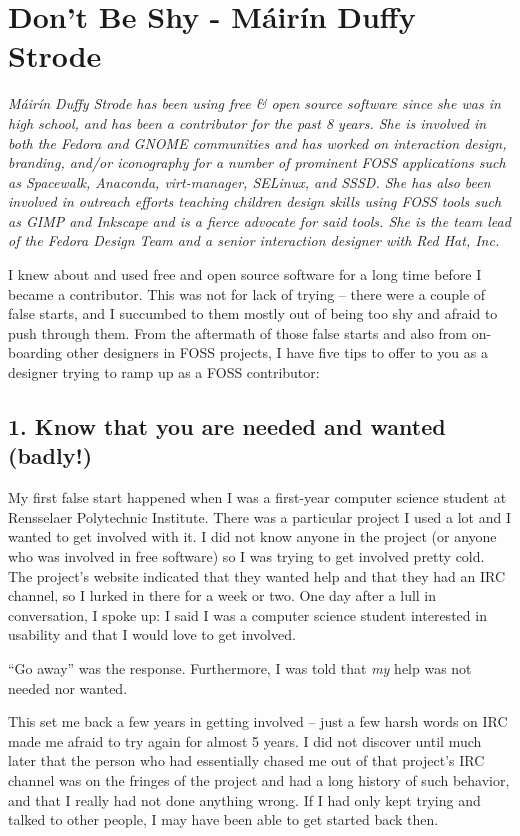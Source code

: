 \chapter{Don't Be Shy - Máirín Duffy Strode}

\textit{Máirín Duffy Strode has been using free \& open source software since she
was in high school, and has been a contributor for the past 8 years. She is involved
in both the Fedora and GNOME communities and has worked on interaction design,
branding, and/or iconography for a number of prominent FOSS applications such as
Spacewalk, Anaconda, virt-manager, SELinux, and SSSD. She has also been involved
in outreach efforts teaching children design skills using FOSS tools such as
GIMP and Inkscape and is a fierce advocate for said tools. She is the team lead
of the Fedora Design Team and a senior interaction designer with Red Hat, Inc.}

I knew about and used free and open source software for a long time before I
became a contributor. This was not for lack of trying -- there were a couple of
false starts, and I succumbed to them mostly out of being too shy and afraid to
push through them. From the aftermath of those false starts and also from
on-boarding other designers in FOSS projects, I have five tips to offer to you
as a designer trying to ramp up as a FOSS contributor:

\section*{1. Know that you are needed and wanted (badly!)}

My first false start happened when I was a first-year computer science student
at Rensselaer Polytechnic Institute. There was a particular project I used a lot
and I wanted to get involved with it. I did not know anyone in the project (or
anyone who was involved in free software) so I was trying to get involved pretty
cold. The project's website indicated that they wanted help and that they had an
IRC channel, so I lurked in there for a week or two. One day after a lull in
conversation, I spoke up: I said I was a computer science student interested in
usability and that I would love to get involved.

``Go away'' was the response. Furthermore, I was told that \emph{my} help was not
needed nor wanted. 

This set me back a few years in getting involved -- just a few harsh words on IRC
made me afraid to try again for almost 5 years.  I did not discover until much
later that the person who had essentially chased me out of that project's IRC
channel was on the fringes of the project and had a long history of such
behavior, and that I really had not done anything wrong. If I had only kept
trying and talked to other people, I may have been able to get started back
then.

